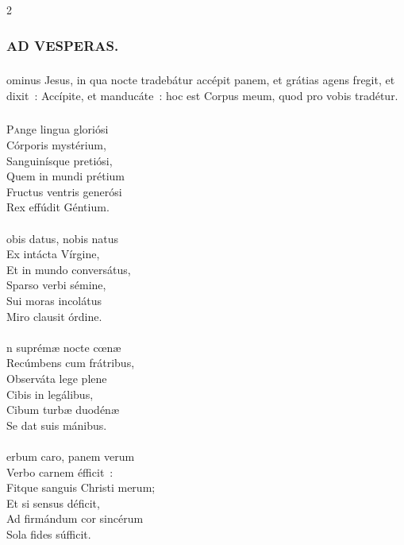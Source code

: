 \documentclass[9pt,twoside]{extarticle}
\begin{document}
\begin{multicols}{2}
\subsubsection*{\center \textsc{AD VESPERAS.}}
\subsubsection*{}
ominus Jesus, in qua nocte tradebátur accépit panem, et grátias agens fregit, et dixit~: Accípite, et manducáte~: hoc est Corpus meum, quod pro vobis tradétur.

\subsubsection*{\center{}}
\lettrine{P}ange lingua gloriósi\\ 
Córporis mystérium,\\ 
Sanguinísque pretiósi,\\ 
Quem in mundi prétium\\ 
Fructus ventris generósi\\ 
Rex effúdit Géntium.\\
\\
obis datus, nobis natus\\ 
Ex intácta Vírgine,\\ 
Et in mundo conversátus,\\ 
Sparso verbi sémine,\\ 
Sui moras incolátus\\ 
Miro clausit órdine.\\ 
\\
n suprémæ nocte cœnæ\\ 
Recúmbens cum frátribus,\\ 
Observáta lege plene\\ 
Cibis in legálibus,\\ 
Cibum turbæ duodénæ\\ 
Se dat suis mánibus.\\
\\
erbum caro, panem verum\\ 
Verbo carnem éfficit~:\\ 
Fitque sanguis Christi merum;\\ 
Et si sensus déficit,\\ 
Ad firmándum cor sincérum\\ 
Sola fides súfficit.\\

\end{multicols}
\end{document}
